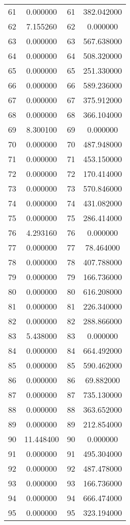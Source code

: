\documentclass[12pt]{article}
\begin{document}
\begin{longtable}{@{}cccc@{}}
61 & 0.000000 & 61 & 382.042000 \\
62 & 7.155260 & 62 & 0.000000 \\
63 & 0.000000 & 63 & 567.638000 \\
64 & 0.000000 & 64 & 508.320000 \\
65 & 0.000000 & 65 & 251.330000 \\
66 & 0.000000 & 66 & 589.236000 \\
67 & 0.000000 & 67 & 375.912000 \\
68 & 0.000000 & 68 & 366.104000 \\
69 & 8.300100 & 69 & 0.000000 \\
70 & 0.000000 & 70 & 487.948000 \\
71 & 0.000000 & 71 & 453.150000 \\
72 & 0.000000 & 72 & 170.414000 \\
73 & 0.000000 & 73 & 570.846000 \\
74 & 0.000000 & 74 & 431.082000 \\
75 & 0.000000 & 75 & 286.414000 \\
76 & 4.293160 & 76 & 0.000000 \\
77 & 0.000000 & 77 & 78.464000 \\
78 & 0.000000 & 78 & 407.788000 \\
79 & 0.000000 & 79 & 166.736000 \\
80 & 0.000000 & 80 & 616.208000 \\
81 & 0.000000 & 81 & 226.340000 \\
82 & 0.000000 & 82 & 288.866000 \\
83 & 5.438000 & 83 & 0.000000 \\
84 & 0.000000 & 84 & 664.492000 \\
85 & 0.000000 & 85 & 590.462000 \\
86 & 0.000000 & 86 & 69.882000 \\
87 & 0.000000 & 87 & 735.130000 \\
88 & 0.000000 & 88 & 363.652000 \\
89 & 0.000000 & 89 & 212.854000 \\
90 & 11.448400 & 90 & 0.000000 \\
91 & 0.000000 & 91 & 495.304000 \\
92 & 0.000000 & 92 & 487.478000 \\
93 & 0.000000 & 93 & 166.736000 \\
94 & 0.000000 & 94 & 666.474000 \\
95 & 0.000000 & 95 & 323.194000 \\

\end{longtable}
\end{document}
